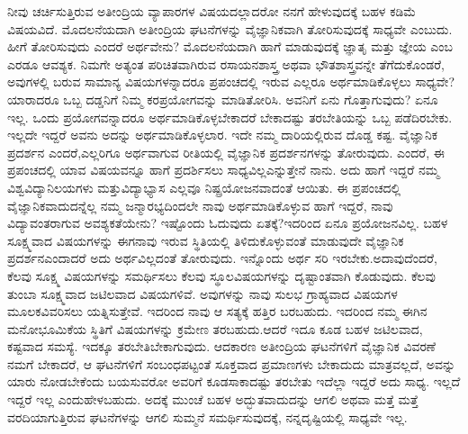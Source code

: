 ನೀವು ಚರ್ಚಿಸುತ್ತಿರುವ ಅತೀಂದ್ರಿಯ ವ್ಯಾಪಾರಗಳ ವಿಷಯದಲ್ಲಾದರೋ ನನಗೆ ಹೇಳುವುದಕ್ಕೆ ಬಹಳ ಕಡಿಮೆ ವಿಷಯವಿದೆ. ಮೊದಲನೆಯದಾಗಿ ಅತೀಂದ್ರಿಯ ಘಟನೆಗಳನ್ನು ವೈಜ್ಞಾನಿಕವಾಗಿ ತೋರಿಸುವುದಕ್ಕೆ ಸಾಧ್ಯವೇ ಎಂಬುದು. ಹೀಗೆ ತೋರಿಸುವುದು ಎಂದರೆ ಅರ್ಥವೇನು? ಮೊದಲನೆಯದಾಗಿ ಹಾಗೆ ಮಾಡುವುದಕ್ಕೆ ಜ್ಞಾತೃ ಮತ್ತು ಜ್ಞೇಯ ಎಂಬ ಎರಡೂ ಆವಶ್ಯಕ. ನಿಮಗೇ ಅತ್ಯಂತ ಪರಿಚಿತವಾಗಿರುವ ರಸಾಯನಶಾಸ್ತ್ರ ಅಥವಾ ಭೌತಶಾಸ್ತ್ರವನ್ನೇ ತೆಗೆದುಕೊಂಡರೆ, ಅವುಗಳಲ್ಲಿ ಬರುವ ಸಾಮಾನ್ಯ ವಿಷಯಗಳನ್ನಾದರೂ ಪ್ರಪಂಚದಲ್ಲಿ ಇರುವ ಎಲ್ಲರೂ ಅರ್ಥಮಾಡಿಕೊಳ್ಳಲು ಸಾಧ್ಯವೇ? ಯಾರಾದರೂ ಒಬ್ಬ ದಡ್ಡನಿಗೆ ನಿಮ್ಮ ಕರಪ್ರಯೋಗವನ್ನು ಮಾಡಿತೋರಿಸಿ. ಅವನಿಗೆ ಏನು ಗೊತ್ತಾಗುವುದು? ಏನೂ ಇಲ್ಲ. ಒಂದು ಪ್ರಯೋಗವನ್ನಾದರೂ ಅರ್ಥಮಾಡಿಕೊಳ್ಳಬೇಕಾದರೆ ಬೇಕಾದಷ್ಟು ತರಬೇತಿಯನ್ನು ಒಬ್ಬ ಪಡೆದಿರಬೇಕು. ಇಲ್ಲದೇ ಇದ್ದರೆ ಅವನು ಅದನ್ನು ಅರ್ಥಮಾಡಿಕೊಳ್ಳಲಾರ. ಇದೇ ನಮ್ಮ ದಾರಿಯಲ್ಲಿರುವ ದೊಡ್ಡ ಕಷ್ಟ. ವೈಜ್ಞಾನಿಕ ಪ್ರದರ್ಶನ ಎಂದರೆ,\break ಎಲ್ಲರಿಗೂ ಅರ್ಥವಾಗುವ ರೀತಿಯಲ್ಲಿ ವೈಜ್ಞಾನಿಕ ಪ್ರದರ್ಶನಗಳನ್ನು ತೋರುವುದು. ಎಂದರೆ, ಈ ಪ್ರಪಂಚದಲ್ಲಿ ಯಾವ ವಿಷಯವನ್ನೂ ಹಾಗೆ ಪ್ರದರ್ಶಿಸಲು ಸಾಧ್ಯವಿಲ್ಲ\break ಎನ್ನುತ್ತೇನೆ ನಾನು. ಅದು ಹಾಗೆ ಇದ್ದರೆ ನಮ್ಮ ವಿಶ್ವವಿದ್ಯಾನಿಲಯಗಳು ಮತ್ತು\break ವಿದ್ಯಾಭ್ಯಾಸ ಎಲ್ಲವೂ ನಿಷ್ಪ್ರಯೋಜನವಾದಂತೆ ಆಯಿತು. ಈ ಪ್ರಪಂಚದಲ್ಲಿ ವೈಜ್ಞಾನಿಕವಾದುದನ್ನೆಲ್ಲ ನಮ್ಮ ಜನ್ಮಾರಭ್ಯದಿಂದಲೇ ನಾವು ಅರ್ಥಮಾಡಿಕೊಳ್ಳುವ ಹಾಗೆ ಇದ್ದರೆ, ನಾವು ವಿದ್ಯಾವಂತರಾಗುವ ಅವಶ್ಯಕತೆಯೇನು? ಇಷ್ಟೊಂದು ಓದುವುದು ಏತಕ್ಕೆ?\break ಇದರಿಂದ ಏನೂ ಪ್ರಯೋಜನವಿಲ್ಲ. ಬಹಳ ಸೂಕ್ಷ್ಮವಾದ ವಿಷಯಗಳನ್ನು ಈಗ\break ನಾವು ಇರುವ ಸ್ಥಿತಿಯಲ್ಲಿ ತಿಳಿದುಕೊಳ್ಳುವಂತೆ ಮಾಡುವುದೇ ವೈಜ್ಞಾನಿಕ ಪ್ರದರ್ಶನ\break ಎಂದಾದರೆ ಅದು ಅರ್ಥವಿಲ್ಲದಂತೆ ತೋರುವುದು. ಇನ್ನೊಂದು ಅರ್ಥ ಸರಿ ಇರಬೇಕು.\break ಅದಾವುದೆಂದರೆ, ಕೆಲವು ಸೂಕ್ಷ್ಮ ವಿಷಯಗಳನ್ನು ಸಮರ್ಥಿಸಲು ಕೆಲವು ಸ್ಥೂಲ\break ವಿಷಯಗಳನ್ನು ದೃಷ್ಟಾಂತವಾಗಿ ಕೊಡುವುದು. ಕೆಲವು ತುಂಬಾ ಸೂಕ್ಷ್ಮವಾದ ಜಟಿಲವಾದ ವಿಷಯಗಳಿವೆ. ಅವುಗಳನ್ನು ನಾವು ಸುಲಭ ಗ್ರಾಹ್ಯವಾದ ವಿಷಯಗಳ ಮೂಲಕ\break ವಿವರಿಸಲು ಯತ್ನಿಸುತ್ತೇವೆ. ಇದರಿಂದ ನಾವು ಆ ಸತ್ಯಕ್ಕೆ ಹತ್ತಿರ ಬರಬಹುದು. ಇದರಿಂದ ನಮ್ಮ ಈಗಿನ ಮನೋಭೂಮಿಕೆಯ ಸ್ಥಿತಿಗೆ ವಿಷಯಗಳನ್ನು ಕ್ರಮೇಣ ತರಬಹುದು.\break ಆದರೆ ಇದೂ ಕೂಡ ಬಹಳ ಜಟಿಲವಾದ, ಕಷ್ಟವಾದ ಸಮಸ್ಯೆ. ಇದಕ್ಕೂ ತರಬೇತಿ\break ಬೇಕಾಗುವುದು. ಆದಕಾರಣ ಅತೀಂದ್ರಿಯ ಘಟನೆಗಳಿಗೆ ವೈಜ್ಞಾನಿಕ ವಿವರಣೆ ನಮಗೆ ಬೇಕಾದರೆ, ಆ ಘಟನೆಗಳಿಗೆ ಸಂಬಂಧಪಟ್ಟಂತೆ ಸೂಕ್ತವಾದ ಪ್ರಮಾಣಗಳು ಬೇಕಾದುದು ಮಾತ್ರವಲ್ಲದೆ, ಅವನ್ನು ಯಾರು ನೋಡಬೇಕೆಂದು ಬಯಸುವರೋ ಅವರಿಗೆ ಕೂಡ\break ಸಾಕಾದಷ್ಟು ತರಬೇತು ಇದೆಲ್ಲಾ ಇದ್ದರೆ ಅದು ಸಾಧ್ಯ. ಇಲ್ಲದೆ ಇದ್ದರೆ ಇಲ್ಲ ಎಂದು\break ಹೇಳಬಹುದು. ಅದಕ್ಕೆ ಮುಂಚೆ ಬಹಳ ಅದ್ಭುತವಾದುದನ್ನು ಆಗಲಿ ಅಥವಾ ಮತ್ತೆ ಮತ್ತೆ ವರದಿಯಾಗುತ್ತಿರುವ ಘಟನೆಗಳನ್ನು ಆಗಲಿ ಸುಮ್ಮನೆ ಸಮರ್ಥಿಸುವುದಕ್ಕೆ, ನನ್ನ\break ದೃಷ್ಟಿಯಲ್ಲಿ ಸಾಧ್ಯವೇ ಇಲ್ಲ.

